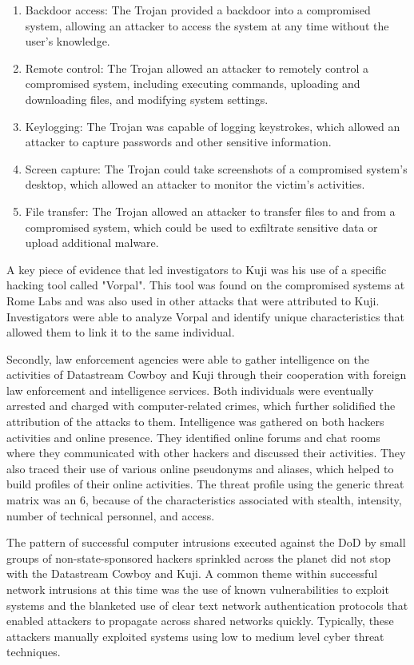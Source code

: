 \documentclass[12pt]{report}
\begin{document}
\begin{enumerate}
  \item Backdoor access: The Trojan provided a backdoor into a compromised system, allowing an attacker to access the system at any time without the user's knowledge.
  \item Remote control: The Trojan allowed an attacker to remotely control a compromised system, including executing commands, uploading and downloading files, and modifying system settings.
  \item Keylogging: The Trojan was capable of logging keystrokes, which allowed an attacker to capture passwords and other sensitive information.
  \item Screen capture: The Trojan could take screenshots of a compromised system's desktop, which allowed an attacker to monitor the victim's activities.
  \item File transfer: The Trojan allowed an attacker to transfer files to and from a compromised system, which could be used to exfiltrate sensitive data or upload additional malware.
\end{enumerate}

A key piece of evidence that led investigators to Kuji was his use of a specific hacking tool called "Vorpal".  This tool was found on the compromised systems at Rome Labs and was also used in other attacks that were attributed to Kuji.  Investigators were able to analyze Vorpal and identify unique characteristics that allowed them to link it to the same individual.

Secondly, law enforcement agencies were able to gather intelligence on the activities of Datastream Cowboy and Kuji through their cooperation with foreign law enforcement and intelligence services. Both individuals were eventually arrested and charged with computer-related crimes, which further solidified the attribution of the attacks to them.  Intelligence was gathered on both hackers activities and online presence.  They identified online forums and chat rooms where they communicated with other hackers and discussed their activities. They also traced their use of various online pseudonyms and aliases, which helped to build profiles of their online activities.  The threat profile using the generic threat matrix was an 6, because of the characteristics associated with stealth, intensity, number of technical personnel, and access.  \cite{delibasis2007modern}

The pattern of successful computer intrusions executed against the DoD by small groups of non-state-sponsored hackers sprinkled across the planet did not stop with the Datastream Cowboy and Kuji.  A common theme within successful network intrusions at this time was the use of known vulnerabilities to exploit systems and the blanketed use of clear text network authentication protocols that enabled attackers to propagate across shared networks quickly.  Typically, these attackers manually exploited systems using low to medium level cyber threat techniques.  
\end{document}

